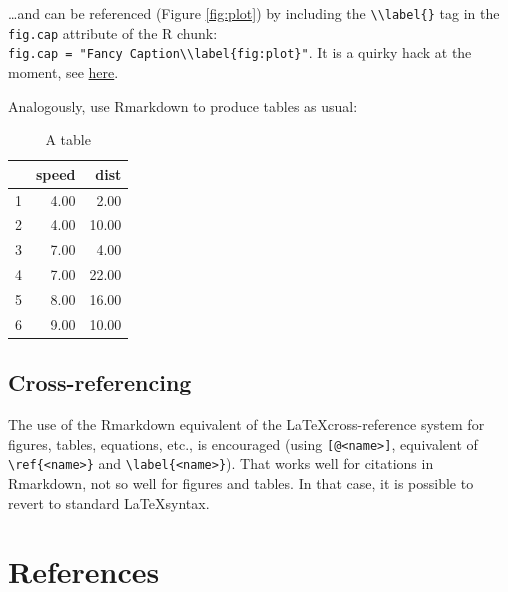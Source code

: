 \documentclass[AMA,STIX1COL,]{WileyNJD-v2}
\begin{document}
\ldots and can be referenced (Figure \ref{fig:plot}) by including the
\texttt{\textbackslash{}\textbackslash{}label\{\}} tag in the
\texttt{fig.cap} attribute of the R chunk:
\texttt{fig.cap\ =\ "Fancy\ Caption\textbackslash{}\textbackslash{}label\{fig:plot\}"}.
It is a quirky hack at the moment, see
\href{https://github.com/yihui/knitr/issues/323}{here}.

Analogously, use Rmarkdown to produce tables as usual:

\begin{table}[ht]
\centering
\begin{tabular}{rrr}
  \hline
 & speed & dist \\ 
  \hline
1 & 4.00 & 2.00 \\ 
  2 & 4.00 & 10.00 \\ 
  3 & 7.00 & 4.00 \\ 
  4 & 7.00 & 22.00 \\ 
  5 & 8.00 & 16.00 \\ 
  6 & 9.00 & 10.00 \\ 
   \hline
\end{tabular}
\caption{A table} 
\label{tab:table}
\end{table}

\hypertarget{cross-referencing}{%
\subsection{Cross-referencing}\label{cross-referencing}}

The use of the Rmarkdown equivalent of the \LaTeX cross-reference system
for figures, tables, equations, etc., is encouraged (using
\texttt{{[}@\textless{}name\textgreater{}{]}}, equivalent of
\texttt{\textbackslash{}ref\{\textless{}name\textgreater{}\}} and
\texttt{\textbackslash{}label\{\textless{}name\textgreater{}\}}). That
works well for citations in Rmarkdown, not so well for figures and
tables. In that case, it is possible to revert to standard
\LaTeX syntax.

\hypertarget{references}{%
\section{References}\label{references}}


\end{document}
